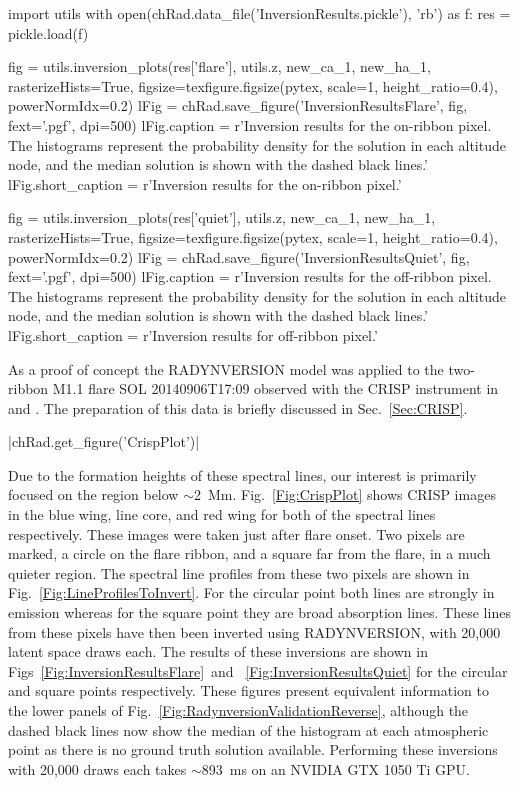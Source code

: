 \begin{pycode}[Radynversion]

import utils
with open(chRad.data_file('InversionResults.pickle'), 'rb') as f:
    res = pickle.load(f)

fig = utils.inversion_plots(res['flare'], utils.z, new_ca_1, new_ha_1, rasterizeHists=True, figsize=texfigure.figsize(pytex, scale=1, height_ratio=0.4), powerNormIdx=0.2)
lFig = chRad.save_figure('InversionResultsFlare', fig, fext='.pgf', dpi=500)
lFig.caption = r'Inversion results for the on-ribbon pixel. The histograms represent the probability density for the solution in each altitude node, and the median solution is shown with the dashed black lines.'
lFig.short_caption = r'Inversion results for the on-ribbon pixel.'

fig = utils.inversion_plots(res['quiet'], utils.z, new_ca_1, new_ha_1, rasterizeHists=True, figsize=texfigure.figsize(pytex, scale=1, height_ratio=0.4), powerNormIdx=0.2)
lFig = chRad.save_figure('InversionResultsQuiet', fig, fext='.pgf', dpi=500)
lFig.caption = r'Inversion results for the off-ribbon pixel. The histograms represent the probability density for the solution in each altitude node, and the median solution is shown with the dashed black lines.'
lFig.short_caption = r'Inversion results for off-ribbon pixel.'
\end{pycode}

As a proof of concept the RADYNVERSION model was applied to the two-ribbon M1.1 flare SOL 20140906T17:09 observed with the CRISP instrument in \Ha{} and \CaLine{}.
The preparation of this data is briefly discussed in Sec.~\ref{Sec:CRISP}.

\py[Radynversion]|chRad.get_figure('CrispPlot')|

Due to the formation heights of these spectral lines, our interest is primarily focused on the region below $\sim$\SI{2}{\mega\metre}.
Fig.~\ref{Fig:CrispPlot} shows CRISP images in the blue wing, line core, and red wing for both of the spectral lines respectively.
These images were taken just after flare onset.
Two pixels are marked, a circle on the flare ribbon, and a square far from the flare, in a much quieter region.
The spectral line profiles from these two pixels are shown in Fig.~\ref{Fig:LineProfilesToInvert}.
For the circular point both lines are strongly in emission whereas for the square point they are broad absorption lines.
These lines from these pixels have then been inverted using RADYNVERSION, with 20,000 latent space draws each.
The results of these inversions are shown in Figs~\ref{Fig:InversionResultsFlare}~and~
\ref{Fig:InversionResultsQuiet} for the circular and square points respectively.
These figures present equivalent information to the lower panels of Fig.~\ref{Fig:RadynversionValidationReverse}, although the dashed black lines now show the median of the histogram at each atmospheric point as there is no ground truth solution available.
Performing these inversions with 20,000 draws each takes $\sim$\SI{893}{\milli\second} on an NVIDIA GTX 1050 Ti GPU.

